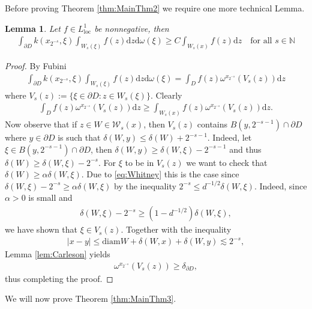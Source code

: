 \documentclass[a4paper,12pt]{article}
\newtheorem{lemma}[theorem]{Lemma}
\theoremstyle{definition}
\theoremstyle{definition}
\begin{document}
	Before proving Theorem \ref{thm:MainThm2} we require one more technical Lemma.
	\begin{lemma}\label{lem:tec}
		Let $f\in L^1_{\mathrm{loc}}$ be nonnegative, then
		\begin{align*}
			\int_{\partial D} k(x_{2^{-s}},\xi)\int_{W_s(\xi)}f(z)\mathrm dz\mathrm d\omega(\xi)\geq C \int_{W_s(x)}f(z)\mathrm dz \quad \text{for all }s\in\mathbb N
		\end{align*}
	\end{lemma}
	\begin{proof}
		By Fubini 
		\begin{align*}
			\int_{\partial D} k(x_{2^{-s}},\xi)\int_{W_s(\xi)}f(z)\mathrm dz\mathrm d\omega(\xi)=\int_Df(z)\omega^{x_{2^{-s}}}(V_s(z))\mathrm dz
		\end{align*}
		where $V_s(z):=\lbrace\xi\in {\partial D}: z\in W_s(\xi)\rbrace$. Clearly
		\begin{align*}
			\int_Df(z)\omega^{x_{2^{-s}}}(V_s(z))\mathrm dz\geq\int_{W_s(x)}f(z)\omega^{x_{2^{-s}}}(V_s(z))\mathrm{d}z.
		\end{align*}
 		Now observe that if $z\in W\in\mathcal{W}_s(x)$, then $V_s(z)$ contains $B\left(y,2^{-s-1}\right)\cap\partial D$ where $y\in\partial D$ is such that $\delta(W,y)\leq\delta(W)+2^{-s-1}$. Indeed, let $\xi\in B\left(y,2^{-s-1}\right)\cap\partial D$, then $\delta(W,y)\geq\delta(W,\xi)-2^{-s-1}$ and thus $\delta(W)\geq\delta(W,\xi)-2^{-s}$. For $\xi$ to be in $V_s(z)$ we want to check that $\delta(W)\geq\alpha\delta(W,\xi)$. Due to \eqref{eq:Whitney} this is the case since $\delta(W,\xi)-2^{-s}\geq\alpha\delta(W,\xi)$ by the inequality $2^{-s}\leq d^{-1/2}\delta(W,\xi)$. Indeed, since $\alpha>0$ is small and 
 		\begin{align*}
 			\delta(W,\xi)-2^{-s}\geq (1-d^{-1/2})\delta(W,\xi),
 		\end{align*}
 		we have shown that $\xi\in V_s(z)$. Together with the inequality
 		\begin{align*}
 			|x-y|\leq\text{diam}W+\delta(W,x)+\delta(W,y)\lesssim 2^{-s},
 		\end{align*}
 		Lemma \ref{lem:Carleson} yields
		\begin{align*}
			\omega^{x_{2^{-s}}}(V_s(z))\geq \delta_{\partial D},
		\end{align*}
		thus completing the proof.
	\end{proof}
	We will now prove Theorem \ref{thm:MainThm3}.
\end{document}
